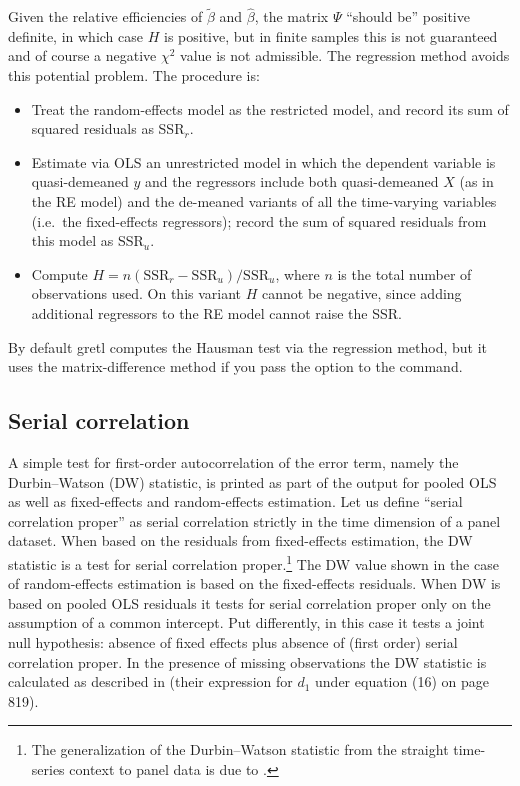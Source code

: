 Given the relative efficiencies of $\tilde{\beta}$ and $\hat{\beta}$,
the matrix $\Psi$ ``should be'' positive definite, in which case $H$ is
positive, but in finite samples this is not guaranteed and of course
a negative $\chi^2$ value is not admissible.  The regression method
avoids this potential problem.  The procedure is:
\begin{itemize}
\item Treat the random-effects model as the restricted model, and
  record its sum of squared residuals as SSR$_r$.
\item Estimate via OLS an unrestricted model in which the dependent
  variable is quasi-demeaned $y$ and the regressors include both
  quasi-demeaned $X$ (as in the RE model) and the de-meaned variants
  of all the time-varying variables (i.e.\ the fixed-effects
  regressors); record the sum of squared residuals from this model
  as SSR$_u$.
\item Compute $H = n \left(\mbox{SSR}_r - \mbox{SSR}_u\right) /
  \mbox{SSR}_u$, where $n$ is the total number of observations used.
  On this variant $H$ cannot be negative, since adding additional
  regressors to the RE model cannot raise the SSR.
\end{itemize}

By default gretl computes the Hausman test via the regression
method, but it uses the matrix-difference method if you pass the
option  to the  command.

\subsection{Serial correlation}
\label{panel-autocorr}

A simple test for first-order autocorrelation of the error term,
namely the Durbin--Watson (DW) statistic, is printed as part of the
output for pooled OLS as well as fixed-effects and random-effects
estimation. Let us define ``serial correlation proper'' as serial
correlation strictly in the time dimension of a panel dataset. When
based on the residuals from fixed-effects estimation, the DW statistic
is a test for serial correlation proper.\footnote{The generalization
  of the Durbin--Watson statistic from the straight time-series
  context to panel data is due to \cite{BFN82}.}  The DW value shown
in the case of random-effects estimation is based on the fixed-effects
residuals. When DW is based on pooled OLS residuals it tests for
serial correlation proper only on the assumption of a common
intercept. Put differently, in this case it tests a joint null
hypothesis: absence of fixed effects plus absence of (first order)
serial correlation proper.  In the presence of missing observations
the DW statistic is calculated as described in \cite{baltagi-Wu99}
(their expression for $d_1$ under equation (16) on page 819).

